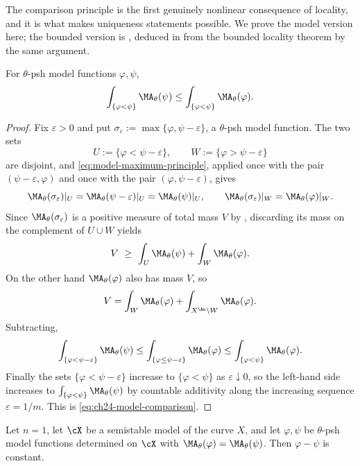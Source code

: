 The comparison principle is the first genuinely nonlinear consequence of
locality, and it is what makes uniqueness statements possible.  We prove the
model version here; the bounded version is
, deduced in
 from the bounded locality theorem by the same
argument.

\begin{proposition}
\label{prop:ch24-model-comparison}
For \(\theta\)-psh model functions \(\varphi,\psi\),
\begin{equation}
\label{eq:ch24-model-comparison}
 \int_{\{\varphi<\psi\}}\MA_\theta(\psi)
 \leq
 \int_{\{\varphi<\psi\}}\MA_\theta(\varphi).
\end{equation}
\end{proposition}

\begin{proof}
Fix \(\varepsilon>0\) and put \(\sigma_\varepsilon
:=\max\{\varphi,\psi-\varepsilon\}\), a \(\theta\)-psh model function.  The
two sets
\[
 U:=\{\varphi<\psi-\varepsilon\},
 \qquad
 W:=\{\varphi>\psi-\varepsilon\}
\]
are disjoint, and \eqref{eq:model-maximum-principle}, applied once with the
pair \((\psi-\varepsilon,\varphi)\) and once with the pair
\((\varphi,\psi-\varepsilon)\), gives
\[
 \MA_\theta(\sigma_\varepsilon)|_U=\MA_\theta(\psi-\varepsilon)|_U
 =\MA_\theta(\psi)|_U,
 \qquad
 \MA_\theta(\sigma_\varepsilon)|_W=\MA_\theta(\varphi)|_W .
\]
Since \(\MA_\theta(\sigma_\varepsilon)\) is a positive measure of total mass
\(V\) by , discarding its mass on the complement of
\(U\cup W\) yields
\[
 V\ \geq\ \int_U\MA_\theta(\psi)+\int_W\MA_\theta(\varphi).
\]
On the other hand \(\MA_\theta(\varphi)\) also has mass \(V\), so
\[
 V=\int_W\MA_\theta(\varphi)+\int_{X^{\An}\setminus W}\MA_\theta(\varphi).
\]
Subtracting,
\[
 \int_{\{\varphi<\psi-\varepsilon\}}\MA_\theta(\psi)
 \leq\int_{\{\varphi\leq\psi-\varepsilon\}}\MA_\theta(\varphi)
 \leq\int_{\{\varphi<\psi\}}\MA_\theta(\varphi).
\]
Finally the sets \(\{\varphi<\psi-\varepsilon\}\) increase to
\(\{\varphi<\psi\}\) as \(\varepsilon\downarrow0\), so the left-hand side
increases to \(\int_{\{\varphi<\psi\}}\MA_\theta(\psi)\) by countable
additivity along the increasing sequence \(\varepsilon=1/m\).  This is
\eqref{eq:ch24-model-comparison}.
\end{proof}

\begin{corollary}
\label{cor:ch24-model-uniqueness-curve}
Let \(n=1\), let \(\cX\) be a semistable model of the curve \(X\), and let
\(\varphi,\psi\) be \(\theta\)-psh model functions determined on \(\cX\)
with \(\MA_\theta(\varphi)=\MA_\theta(\psi)\).  Then \(\varphi-\psi\) is
constant.
\end{corollary}

